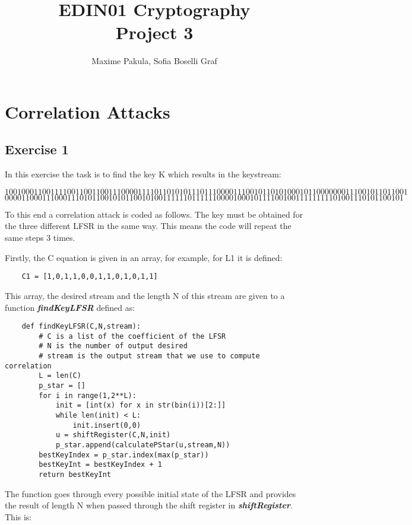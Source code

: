 \documentclass{article}
\title{EDIN01 Cryptography \\ Project 3}
\author{Maxime Pakula, Sofia Boselli Graf}
\begin{document}
\maketitle

\tableofcontents

\newpage

\section{Correlation Attacks}
\subsection{Exercise 1}

In this exercise the task is to find the key K which results in the keystream:

$$1001000110011110011001100111000011110110101011101110000111001011010100010110000000111001011011001$$
$$000011000111000111010110010101100101001111110111111000010001011110010011111111101001110101100101$$

To this end a correlation attack is coded as follows. 
The key must be obtained for the three different LFSR in the same way. This means the code will repeat the same steps 3 times. 

Firstly, the C equation is given in an array, for example, for L1 it is defined:
\begin{verbatim}
    C1 = [1,0,1,1,0,0,1,1,0,1,0,1,1]
\end{verbatim}

This array, the desired stream and the length N of this stream are given to a function \textbf{\textit{findKeyLFSR}} defined as:

\begin{verbatim}
    def findKeyLFSR(C,N,stream):
        # C is a list of the coefficient of the LFSR
        # N is the number of output desired
        # stream is the output stream that we use to compute correlation
        L = len(C)
        p_star = []
        for i in range(1,2**L):
            init = [int(x) for x in str(bin(i))[2:]]
            while len(init) < L:
                init.insert(0,0)
            u = shiftRegister(C,N,init)
            p_star.append(calculatePStar(u,stream,N))
        bestKeyIndex = p_star.index(max(p_star))
        bestKeyInt = bestKeyIndex + 1
        return bestKeyInt
\end{verbatim}

The function goes through every possible initial state of the LFSR and provides the result of length N when passed through the shift register in \textbf{\textit{shiftRegister}}. This is:
\end{document}
